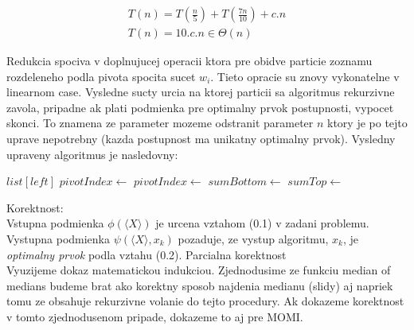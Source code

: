 \documentclass[paper=a4, fontsize=11pt]{scrartcl} %
\numberwithin{equation}{section} %
\numberwithin{figure}{section} %
\numberwithin{table}{section} %
\begin{document}
\begin{equation}
    \begin{aligned}
        T(n) = T\left(\frac{n}{5}\right) + T\left(\frac{7n}{10}\right)+c.n \\
        T(n) = 10.c.n \in \Theta(n)
    \end{aligned}
\end{equation}

Redukcia spociva v doplnujucej operacii ktora pre obidve particie zoznamu rozdeleneho podla pivota spocita sucet $w_i$.
Tieto opracie su znovy vykonatelne v linearnom case. Vysledne sucty urcia na ktorej particii sa algoritmus rekurzivne zavola, pripadne ak plati podmienka pre optimalny prvok postupnosti, vypocet skonci. To znamena ze parameter mozeme odstranit parameter $n$ ktory je po tejto uprave nepotrebny (kazda postupnost ma unikatny optimalny prvok). Vysledny upraveny algoritmus je nasledovny:

\begin{algorithmic}[1]
            \State \Return $list[left]$
        \EndIf
       	\State $pivotIndex \gets$ 
        \State $pivotIndex \gets$ 
        \State $sumBottom \gets$ 
        \State $sumTop \gets$ 
            \State \Return {}
        \Else
            \State \Return {}        
        \EndIf
    \EndFunction \\
    	\State \Return {}    
    \EndFunction
\end{algorithmic}

Korektnost: \\
Vstupna podmienka $\phi(\langle X \rangle)$ je urcena vztahom (0.1) v zadani problemu.\\
Vystupna podmienka $\psi(\langle X \rangle, x_k)$ pozaduje, ze vystup algoritmu, $x_k$, je {\em optimalny prvok} podla vztahu (0.2).
Parcialna korektnost \\
Vyuzijeme dokaz matematickou indukciou. Zjednodusime ze funkciu median of medians budeme brat ako korektny sposob najdenia medianu (slidy) aj napriek tomu ze obsahuje rekurzivne volanie do tejto procedury. Ak dokazeme korektnost v tomto zjednodusenom pripade, dokazeme to aj pre MOMI. 
\end{document}
